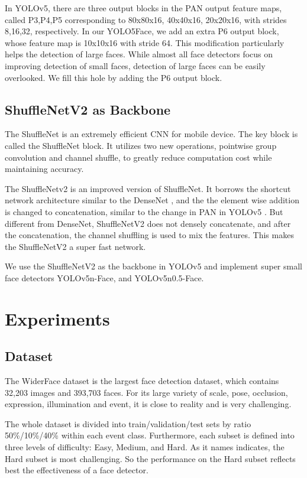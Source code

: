 \documentclass[conference]{IEEEtran}
\begin{document}
In YOLOv5, there are three output blocks in the PAN output feature maps, called P3,P4,P5 corresponding to 80x80x16, 40x40x16, 20x20x16, with strides 8,16,32, respectively. In our YOLO5Face, we add an extra P6 output block, whose feature map is 10x10x16 with stride 64. This modification particularly helps the detection of large faces. While almost all face detectors focus on improving detection of small faces, detection of large faces can be easily overlooked. We fill this hole by adding the P6 output block.  

\subsection{ShuffleNetV2 as Backbone}

The ShuffleNet \cite{ShuffleNet} is an extremely efficient CNN for mobile device. The key block is called the ShuffleNet block.  It utilizes two new operations, pointwise group convolution and channel shuffle, to greatly reduce computation cost while maintaining accuracy. 

The ShuffleNetv2 \cite{ShuffleNet} is an improved version of ShuffleNet. It borrows the shortcut network architecture similar to the DenseNet \cite{DenseNet}, and the the element wise addition is changed to concatenation, similar to the change in PAN \cite{PAN} in YOLOv5 \cite{YOLOv5}. But different from DenseNet, ShuffleNetV2 does not densely concatenate, and after the concatenation, the channel shuffling is used to mix the features.  This makes the ShuffleNetV2 a super fast network. 

We use the ShuffleNetV2 as the backbone in YOLOv5 and implement super small face detectors YOLOv5n-Face, and YOLOv5n0.5-Face. 

\section{Experiments}

\subsection{Dataset}

The WiderFace dataset \cite{WiderFace} is the largest face detection dataset, which contains 32,203 images and 393,703 faces.  For its large variety of scale, pose, occlusion, expression, illumination and event, it is close to reality and is very challenging.  

The whole dataset is divided into train/validation/test sets by ratio 50\%/10\%/40\% within each event class. Furthermore, each subset is defined into three levels of difficulty: Easy, Medium, and Hard. As it names indicates, the Hard subset is most challenging. So the performance on the Hard subset reflects best the effectiveness of a face detector.  
\end{document}
